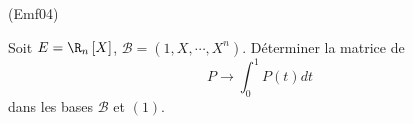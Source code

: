 \begin{tiny}(Emf04)\end{tiny}
Soit $E=\R_{n}\left[ X\right] $, $\mathcal{B}=(1,X,\cdots,X^{n})$. D{\'e}terminer la matrice de 
\begin{displaymath}
P\rightarrow \int_{0}^{1}P(t)dt 
\end{displaymath}
dans les bases $\mathcal{B}$ et $(1)$.